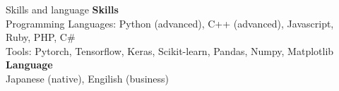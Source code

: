 \begin{rSection}{Skills and language}
{\bf Skills} \\
Programming Languages: Python (advanced), C++ (advanced), Javascript, Ruby, PHP, C\# \\
Tools: Pytorch, Tensorflow, Keras, Scikit-learn, Pandas, Numpy, Matplotlib \\
{\bf Language} \\
Japanese (native), Engilish (business) \\
\end{rSection}